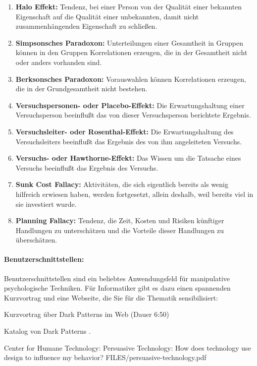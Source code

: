\begin{enumerate}
\item \textbf{Halo Effekt:} Tendenz, bei einer Person von der Qualität einer bekannten Eigenschaft auf die Qualität einer
unbekannten, damit nicht zusammenhängenden Eigenschaft zu schließen.
\item \textbf{Simpsonsches Paradoxon:} Unterteilungen einer Gesamtheit in Gruppen können in den Gruppen Korrelationen erzeugen, die in der Gesamtheit
nicht oder anders vorhanden sind.
\item \textbf{Berksonsches Paradoxon:} Vorauswahlen können Korrelationen erzeugen, die in der Grundgesamtheit nicht bestehen.
\item \textbf{Versuchspersonen- oder Placebo-Effekt:} Die Erwartungshaltung einer Versuchsperson beeinflußt das von dieser Versuchsperson berichtete Ergebnis. 
\item \textbf{Versuchsleiter- oder Rosenthal-Effekt:} Die Erwartungshaltung des Versuchsleiters beeinflußt das Ergebnis
des von ihm angeleiteten Versuchs.
\item \textbf{Versuchs- oder Hawthorne-Effekt:} Das Wissen um die Tatsache eines Versuchs beeinflußt das Ergebnis des Versuchs.
\item \textbf{Sunk Cost Fallacy:} 
Aktivitäten, die sich eigentlich bereits als wenig hilfreich erwiesen haben, werden fortgesetzt, allein
deshalb, weil bereits viel in sie investiert wurde.
\item \textbf{Planning Fallacy:} Tendenz, die Zeit, Kosten und Risiken künftiger Handlungen zu unterschätzen und die Vorteile
dieser Handlungen zu überschätzen.
\end{enumerate}



\paragraph{Benutzerschnittstellen:}
Benutzerschnittstellen sind ein beliebtes An\-wen\-dungs\-feld für manipulative psychologische Techniken.
Für Informatiker gibt es dazu einen spannenden Kurzvortrag und eine Webseite, die Sie für die
Thematik sensibilisiert:


{Kurzvortrag über Dark Patterns im Web}
{}
{\href{https://youtu.be/Zmv7cRELFtM}{\online}}
(Dauer 6:50)


{Katalog von Dark Patterns}
{}
{\href{https://www.darkpatterns.org/types-of-dark-pattern}{\online}}.

{Center for Humane Technology: Persuasive Technology: How does technology use design to influence my behavior?}
{FILES/persuasive-technology.pdf}
{\href{https://www.humanetech.com/youth/persuasive-technology}{\online}}


